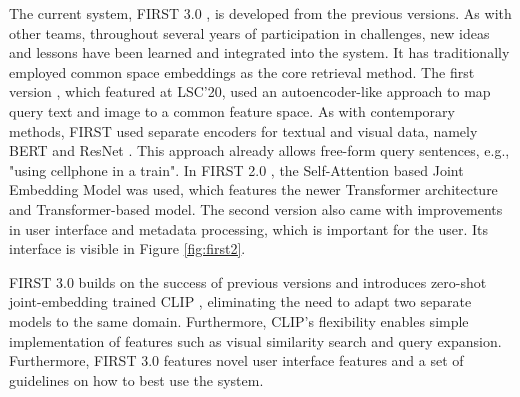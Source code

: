 The current system, FIRST 3.0 , is developed from the previous versions. As with other teams, throughout several years of participation in challenges, new ideas and lessons have been learned and integrated into the system. It has traditionally employed common space embeddings as the core retrieval method. The first version \cite{tran_first_2020}, which featured at LSC'20, used an autoencoder-like approach to map query text and image to a common feature space. As with contemporary methods, FIRST used separate encoders for textual and visual data, namely BERT \cite{devlin_bert_2019} and ResNet \cite{he_deep_2016}. This approach already allows free-form query sentences, e.g., "using cellphone in a train". In FIRST 2.0 \cite{trang-trung_flexible_2021}, the Self-Attention based Joint Embedding Model \cite{trang-trung_lifelog_2020} was used, which features the newer Transformer \cite{devlin_bert_2019} architecture and Transformer-based model. The second version also came with improvements in user interface and metadata processing, which is important for the user. Its interface is visible in Figure \ref{fig:first2}.

FIRST 3.0  builds on the success of previous versions and introduces zero-shot joint-embedding trained CLIP \cite{radford_learning_2021}, eliminating the need to adapt two separate models to the same domain. Furthermore, CLIP's flexibility enables simple implementation of features such as visual similarity search and query expansion. Furthermore, FIRST 3.0 features novel user interface features and a set of guidelines on how to best use the system.